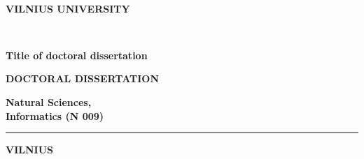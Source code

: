 \thispagestyle{empty}                   %
{\selectfont
\renewcommand\bfdefault{m}%

\begin{flushright}
\thesisDOI \\ %
\thesisORCID
\end{flushright}
\begin{center}

	\vspace*{5mm}	
	\begin{flushleft}
\renewcommand\bfdefault{m}
\bf \large
	VILNIUS UNIVERSITY \\
	\end{flushleft}
	
	
	\vspace{50mm}
	\begin{flushleft}
	{\Large \bf  \thesisAuthorName  \\ \MakeUppercase{\thesisAuthorSurname} \par}
    \end{flushleft}

	\vspace{10mm}
	\begin{flushleft}
	{\huge \bf
\fontsize{21}{21}\selectfont
	Title of doctoral dissertation \par
	}
    \end{flushleft}

    \vspace{5mm}
\begin{flushleft}
\renewcommand\bfdefault{b}
  {\bf DOCTORAL DISSERTATION}\\%
\end{flushleft}
  \vspace{15mm}
  \begin{flushleft}
\renewcommand\bfdefault{m}
\bf
  Natural Sciences, \\ %
  Informatics (N 009)  %
  \end{flushleft}
     \begin{flushleft} 
  		\noindent\rule{3cm}{0.4pt}
     \end{flushleft} 
   \begin{flushleft} \bf
  VILNIUS \thesisYear
   \end{flushleft} 
\end{center}
}
\newpage
\thispagestyle{empty}                   %

